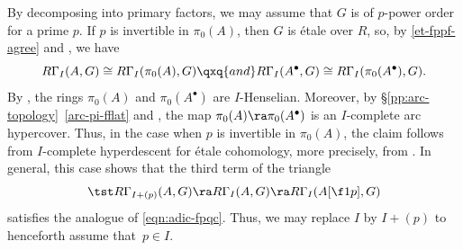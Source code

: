 By decomposing into primary factors, we may assume that $G$ is of $p$-power order for a prime $p$. If $p$ is invertible in $\pi_0(A)$, then $G$ is \'{e}tale over $R$, so, by \eqref{et-fppf-agree} and , we have
\[
R\Gamma_I(A, G) \cong R\Gamma_I(\pi_0(A), G) \qxq{and} R\Gamma_I(A^\bullet, G) \cong R\Gamma_I(\pi_0(A^\bullet), G). %
\]
By , the rings $\pi_0(A)$ and $\pi_0(A^\bullet)$ are $I$-Henselian. Moreover, by \S\ref{pp:arc-topology}~\ref{arc-pi-fflat} and , the map $\pi_0(A) \ra \pi_0(A^\bullet)$ is an $I$-complete arc hypercover. Thus, in the case when $p$ is invertible in $\pi_0(A)$, the claim follows from $I$-complete hyperdescent for \'{e}tale cohomology, more precisely, from . In general, this case shows that the third term of the triangle
\[
\tst R\Gamma_{I + (p)}(A, G) \ra R\Gamma_I(A, G) \ra R\Gamma_I(A[\f1p], G)
\]
satisfies the analogue of \eqref{eqn:adic-fpqc}. Thus, we may replace $I$ by $I + (p)$ to henceforth assume that~$p \in I$.


